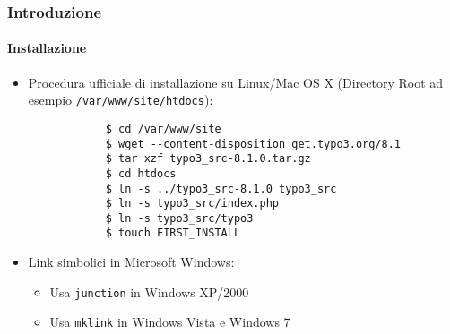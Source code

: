 \begin{frame}[fragile]
	\frametitle{Introduzione}
	\framesubtitle{Installazione}

	\begin{itemize}
		\item Procedura ufficiale di installazione su Linux/Mac OS X\newline
			(Directory Root ad esempio \texttt{/var/www/site/htdocs}):
		\begin{lstlisting}
			$ cd /var/www/site
			$ wget --content-disposition get.typo3.org/8.1
			$ tar xzf typo3_src-8.1.0.tar.gz
			$ cd htdocs
			$ ln -s ../typo3_src-8.1.0 typo3_src
			$ ln -s typo3_src/index.php
			$ ln -s typo3_src/typo3
			$ touch FIRST_INSTALL
		\end{lstlisting}

		\item Link simbolici in Microsoft Windows:

			\begin{itemize}
				\item Usa \texttt{junction} in Windows XP/2000
				\item Usa \texttt{mklink} in Windows Vista e Windows 7
			\end{itemize}

	\end{itemize}
\end{frame}

